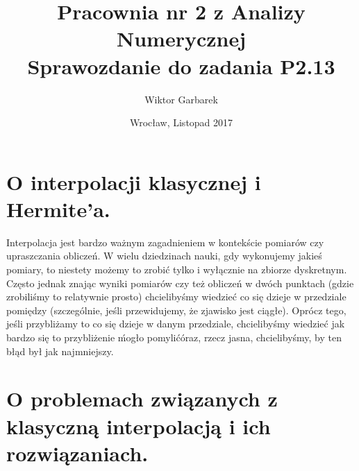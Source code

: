 \documentclass[10pt,wide]{mwart}
\theoremstyle{definition}
\begin{document}
\title{\textbf{Pracownia nr 2 z Analizy Numerycznej}\\
Sprawozdanie do zadania \textbf{P2.13}}
\author{Wiktor Garbarek}
\date{Wrocław, Listopad 2017}

\maketitle
 \thispagestyle{empty}
 \section{O interpolacji klasycznej i Hermite'a.}
 Interpolacja jest bardzo ważnym zagadnieniem w kontekście pomiarów czy upraszczania obliczeń. W wielu dziedzinach nauki, gdy wykonujemy jakieś pomiary,
 to niestety możemy to zrobić tylko i wyłącznie na zbiorze dyskretnym. Często jednak znając wyniki pomiarów czy też obliczeń w dwóch punktach
 (gdzie zrobiliśmy to relatywnie prosto) chcielibyśmy wiedzieć co się dzieje w przedziale pomiędzy (szczególnie, jeśli przewidujemy, że zjawisko jest ciągłe).
 Oprócz tego, jeśli przybliżamy to co się dzieje w danym przedziale, chcielibyśmy wiedzieć jak bardzo się to przybliżenie \'mogło pomylić\' oraz, rzecz jasna, chcielibyśmy,
 by ten błąd był jak najmniejszy.

 \section{O problemach związanych z klasyczną interpolacją i ich rozwiązaniach.}
\end{document}
